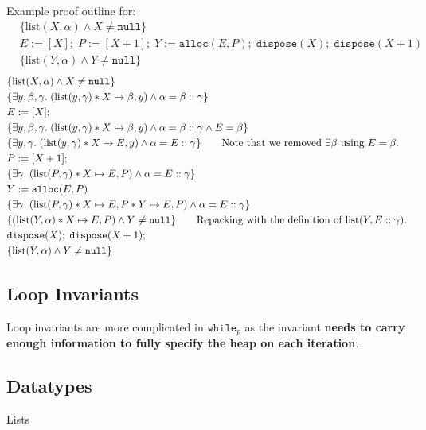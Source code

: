 \documentclass[a4paper, 11pt]{article}
\begin{document}
{{        Example proof outline for:
        \begin{align*}
        & \{\text{list}(X,\alpha) \wedge X \neq \texttt{null}\} \\
        & E:=[X];\;P:=[X+1];\;Y:=\texttt{alloc}(E,P);\;\texttt{dispose}(X);\;\texttt{dispose}(X+1) \\
        & \{\text{list}(Y,\alpha) \wedge Y \neq \texttt{null}\}
        \end{align*}
        \begin{align*}
        & \{\text{list}(X,\alpha) \wedge X \neq \texttt{null}\} \\
        & \{\exists y,\beta,\gamma.\; (\text{list}(y, \gamma) * X \mapsto \beta,y) \wedge \alpha=\beta::\gamma\} \\
        & E := [X]; \\
        & \{\exists y,\beta,\gamma.\; (\text{list}(y, \gamma) * X \mapsto \beta,y) \wedge \alpha=\beta::\gamma \wedge E = \beta\} \\
        & \{\exists y,\gamma.\; (\text{list}(y, \gamma) * X \mapsto E,y) \wedge \alpha=E::\gamma\} \tag*{Note that we removed \(\exists \beta\) using \(E=\beta\).} \\
        & P := [X+1]; \\
        & \{\exists \gamma.\; (\text{list}(P, \gamma) * X \mapsto E,P) \wedge \alpha=E::\gamma\} \\
        & Y := \texttt{alloc}(E,P) \\
        & \{\exists \gamma.\; (\text{list}(P, \gamma) * X \mapsto E,P * Y \mapsto E,P) \wedge \alpha=E::\gamma\} \\
        & \{(\text{list}(Y, \alpha) * X \mapsto E,P) \wedge Y \neq \texttt{null}\} \tag*{Repacking with the definition of \(\text{list}(Y, E::\gamma)\).} \\
        & \texttt{dispose}(X);\;\texttt{dispose}(X + 1); \\
        & \{\text{list}(Y,\alpha) \wedge Y \neq \texttt{null}\}
        \end{align*}
    }
    \subsection*{Loop Invariants}
    {
        Loop invariants are more complicated in \(\texttt{while}_p\) as the invariant \textbf{needs to carry enough information to fully specify the heap on each iteration}.
    }
    \subsection*{Datatypes}
    {
        \begin{description}
        \item[Lists]
        {
            \hfill

}
\end{description}}}
\end{document}
